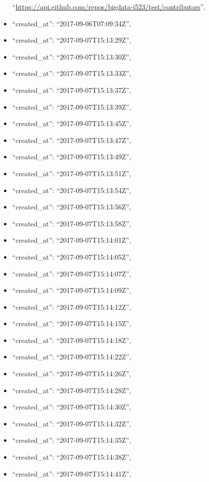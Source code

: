 \begin{itemize}
  ``\url{https://api.github.com/repos/bigdata-i523/test/contributors}'',
\item
  ``created\_at'': ``2017-09-06T07:09:34Z'',
\item
  ``created\_at'': ``2017-09-07T15:13:29Z'',
\item
  ``created\_at'': ``2017-09-07T15:13:30Z'',
\item
  ``created\_at'': ``2017-09-07T15:13:33Z'',
\item
  ``created\_at'': ``2017-09-07T15:13:37Z'',
\item
  ``created\_at'': ``2017-09-07T15:13:39Z'',
\item
  ``created\_at'': ``2017-09-07T15:13:45Z'',
\item
  ``created\_at'': ``2017-09-07T15:13:47Z'',
\item
  ``created\_at'': ``2017-09-07T15:13:49Z'',
\item
  ``created\_at'': ``2017-09-07T15:13:51Z'',
\item
  ``created\_at'': ``2017-09-07T15:13:54Z'',
\item
  ``created\_at'': ``2017-09-07T15:13:56Z'',
\item
  ``created\_at'': ``2017-09-07T15:13:58Z'',
\item
  ``created\_at'': ``2017-09-07T15:14:01Z'',
\item
  ``created\_at'': ``2017-09-07T15:14:05Z'',
\item
  ``created\_at'': ``2017-09-07T15:14:07Z'',
\item
  ``created\_at'': ``2017-09-07T15:14:09Z'',
\item
  ``created\_at'': ``2017-09-07T15:14:12Z'',
\item
  ``created\_at'': ``2017-09-07T15:14:15Z'',
\item
  ``created\_at'': ``2017-09-07T15:14:18Z'',
\item
  ``created\_at'': ``2017-09-07T15:14:22Z'',
\item
  ``created\_at'': ``2017-09-07T15:14:26Z'',
\item
  ``created\_at'': ``2017-09-07T15:14:28Z'',
\item
  ``created\_at'': ``2017-09-07T15:14:30Z'',
\item
  ``created\_at'': ``2017-09-07T15:14:32Z'',
\item
  ``created\_at'': ``2017-09-07T15:14:35Z'',
\item
  ``created\_at'': ``2017-09-07T15:14:38Z'',
\item
  ``created\_at'': ``2017-09-07T15:14:41Z'',

\end{itemize}
